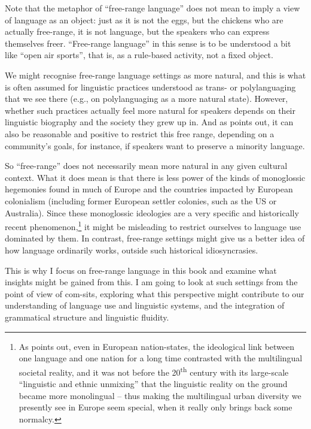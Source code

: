Note that the metaphor of “free-range language” does not mean to imply a view of language as an object: just as it is not the eggs, but the chickens who are actually free-range, it is not language, but the speakers who can express themselves freer. “Free-range language” in this sense is to be understood a bit like “open air sports”, that is, as a rule-based activity, not a fixed object.

We might recognise free-range language settings as more natural, and this is what is often assumed for linguistic practices understood as trans- or polylanguaging that we see there (e.g., \citealt{AgJørgensen2013} on polylanguaging as a more natural state). However, whether such practices actually feel more natural for speakers depends on their linguistic biography and the society they grew up in. And as \citet{Jaspers2019} points out, it can also be reasonable and positive to restrict this free range, depending on a community's goals, for instance, if speakers want to preserve a minority language.

So “free-range” does not necessarily mean more natural in any given cultural context. What it does mean is that there is less power of the kinds of monoglossic hegemonies found in much of Europe and the countries impacted by European colonialism (including former European settler colonies, such as the US or Australia). Since these monoglossic ideologies are a very specific and historically recent phenomenon,\footnote{As \citet{Pavlenko2023} points out, even in European nation-states, the ideological link between one language and one nation for a long time contrasted with the multilingual societal reality, and it was not before the 20\textsuperscript{th} century with its large-scale “linguistic and ethnic unmixing” \citep[34]{Pavlenko2023} that the linguistic reality on the ground became more monolingual – thus making the multilingual urban diversity we presently see in Europe seem special, when it really only brings back some normalcy.} it might be misleading to restrict ourselves to language use dominated by them. In contrast, free-range settings might give us a better idea of how language ordinarily works, outside such historical idiosyncrasies.

This is why I focus on free-range language in this book and examine what insights might be gained from this. I am going to look at such settings from the point of view of com-sits, exploring what this perspective might contribute to our understanding of language use and linguistic systems, and the integration of grammatical structure and linguistic fluidity.

